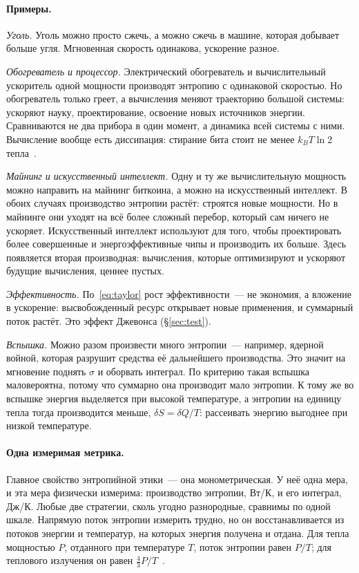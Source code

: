 \documentclass[11pt,a4paper]{article}
\newcommand{\Sref}[1]{\hyperref[#1]{\S\ref{#1}}}
\begin{document}
\paragraph{Примеры.}
\emph{Уголь.} Уголь можно просто сжечь, а можно сжечь в машине, которая добывает больше угля. Мгновенная скорость одинакова, ускорение разное.

\emph{Обогреватель и процессор.} Электрический обогреватель и вычислительный ускоритель одной мощности производят энтропию с одинаковой скоростью. Но обогреватель только греет, а вычисления меняют траекторию большой системы: ускоряют науку, проектирование, освоение новых источников энергии. Сравниваются не два прибора в один момент, а динамика всей системы с ними. Вычисление вообще есть диссипация: стирание бита стоит не менее $k_BT\ln2$ тепла~\cite{landauer1961}.

\emph{Майнинг и искусственный интеллект.} Одну и ту же вычислительную мощность можно направить на майнинг биткоина, а можно на искусственный интеллект. В обоих случаях производство энтропии растёт: строятся новые мощности. Но в майнинге они уходят на всё более сложный перебор, который сам ничего не ускоряет. Искусственный интеллект используют для того, чтобы проектировать более совершенные и энергоэффективные чипы и производить их больше. Здесь появляется вторая производная: вычисления, которые оптимизируют и ускоряют будущие вычисления, ценнее пустых.

\emph{Эффективность.} По~\eqref{eq:taylor} рост эффективности~--- не экономия, а вложение в ускорение: высвобожденный ресурс открывает новые применения, и суммарный поток растёт. Это эффект Джевонса (\Sref{sec:test}).

\emph{Вспышка.} Можно разом произвести много энтропии~--- например, ядерной войной, которая разрушит средства её дальнейшего производства. Это значит на мгновение поднять $\sigma$ и оборвать интеграл. По критерию такая вспышка маловероятна, потому что суммарно она производит мало энтропии. К тому же во вспышке энергия выделяется при высокой температуре, а энтропии на единицу тепла тогда производится меньше, $\delta S=\delta Q/T$: рассеивать энергию выгоднее при низкой температуре.

\paragraph{Одна измеримая метрика.}
Главное свойство энтропийной этики~--- она монометрическая. У неё одна мера, и эта мера физически измерима: производство энтропии, Вт/К, и его интеграл, Дж/К. Любые две стратегии, сколь угодно разнородные, сравнимы по одной шкале. Напрямую поток энтропии измерить трудно, но он восстанавливается из потоков энергии и температур, на которых энергия получена и отдана. Для тепла мощностью $P$, отданного при температуре $T$, поток энтропии равен $P/T$; для теплового излучения он равен $\tfrac43P/T$~\cite{wu2010}.
\end{document}
